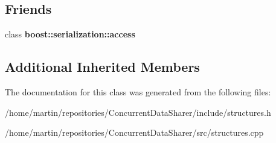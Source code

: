 \subsection*{Friends}
\begin{DoxyCompactItemize}
\item 
class {\bfseries boost\+::serialization\+::access}\hypertarget{classQueueElementMultiSend_ac98d07dd8f7b70e16ccb9a01abf56b9c}{}\label{classQueueElementMultiSend_ac98d07dd8f7b70e16ccb9a01abf56b9c}

\end{DoxyCompactItemize}
\subsection*{Additional Inherited Members}


The documentation for this class was generated from the following files\+:\begin{DoxyCompactItemize}
\item 
/home/martin/repositories/\+Concurrent\+Data\+Sharer/include/structures.\+h\item 
/home/martin/repositories/\+Concurrent\+Data\+Sharer/src/structures.\+cpp\end{DoxyCompactItemize}
